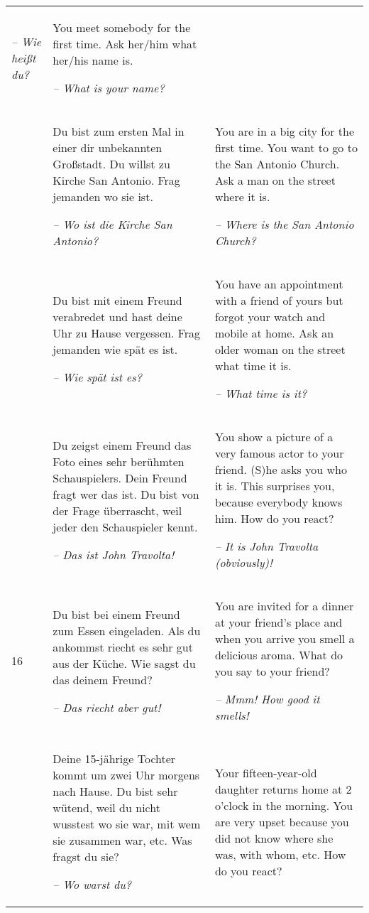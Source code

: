 \begin{xltabular}{\textwidth}{lQQ}
{\itshape -- Wie heißt du?} & You meet somebody for the first time. Ask her/him what her/his name is.

{\itshape -- What is your name?}\\
 & Du bist zum ersten Mal in einer dir unbekannten Großstadt. Du willst zu Kirche San Antonio. Frag jemanden wo sie ist.

\textit{-- Wo ist die Kirche San Antonio?} & You are in a big city for the first time. You want to go to the San Antonio Church. Ask a man on the street where it is.

{\itshape -- Where is the San Antonio Church?}\\
 & Du bist mit einem Freund verabredet und hast deine Uhr zu Hause vergessen. Frag jemanden wie spät es ist.

\textit{-- Wie spät ist es?} & You have an appointment with a friend of yours but forgot your watch and mobile at home. Ask an older woman on the street what time it is.

{\itshape -- What time is it?}\\
 & Du zeigst einem Freund das Foto eines sehr berühmten Schauspielers. Dein Freund fragt wer das ist. Du bist von der Frage überrascht, weil jeder den Schauspieler kennt.

\textit{-- Das ist John Travolta!} & You show a picture of a very famous actor to your friend. (S)he asks you who it is. This surprises you, because everybody knows him. How do you react?

{\itshape -- It is John Travolta (obviously)!}\\
16 & Du bist bei einem Freund zum Essen eingeladen. Als du ankommst riecht es sehr gut aus der Küche. Wie sagst du das deinem Freund?

\textit{-- Das riecht aber gut!} & You are invited for a dinner at your friend’s place and when you arrive you smell a delicious aroma. What do you say to your friend?

{\itshape -- Mmm! How good it smells!}\\
 & Deine 15-jährige Tochter kommt um zwei Uhr morgens nach Hause. Du bist sehr wütend, weil du nicht wusstest wo sie war, mit wem sie zusammen war, etc. Was fragst du sie?

\textit{-- Wo warst du?} & Your fifteen-year-old daughter returns home at 2 o’clock in the morning. You are very upset because you did not know where she was, with whom, etc. How do you react?


\end{xltabular}
